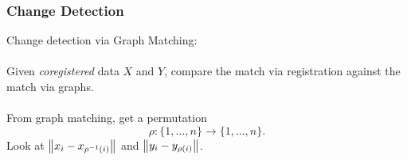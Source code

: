 \documentclass{beamer}
\begin{document}

\begin{frame}
  \frametitle{Change Detection}
  Change detection via Graph Matching:\\~\\
  Given \emph{coregistered} data $X$ and $Y$, compare the match via registration against the match via graphs.\\~\\
  From graph matching, get a permutation
  \[\rho: \{1,\ldots,n\} \to \{1,\ldots,n\}.\]
  Look at $\left\lVert x_i-x_{\rho^{-1}(i)}\right\rVert$ and $\left\lVert y_i - y_{\rho(i)}\right\rVert$. \\~\\
\end{frame}

\end{document}
